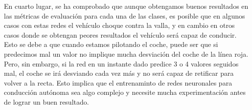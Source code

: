 En cuarto lugar, se ha comprobado que aunque obtengamos buenos resultados en las métricas de evaluación para cada una de las clases, es posible que en algunos casos con estas redes el vehículo choque contra la valla, y en cambio en otros casos donde se obtengan peores resultados el vehículo será capaz de conducir. Esto se debe a que cuando estamos pilotando el coche, puede ser que si predecimos mal un valor no implique mucha desviación del coche de la línea roja. Pero, sin embargo, si la red en un instante dado predice 3 o 4 valores seguidos mal, el coche se irá desviando cada vez más y no será capaz de retificar para volver a la recta. Esto implica que el entrenaminto de redes neuronales para conducción autónoma sea algo complejo y necesite mucha experimentación antes de lograr un buen resultado.